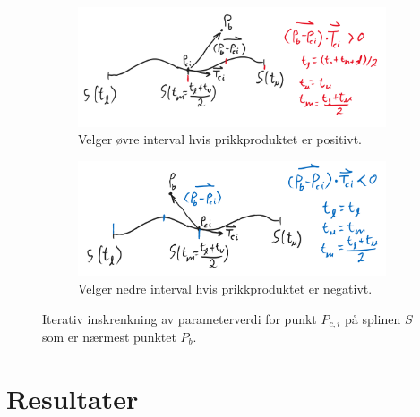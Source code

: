 \documentclass[norsk, doc, 11pt, a4paper]{apa7}  %
\begin{document}
\begin{figure}[H]
	\centering
	\begin{subfigure}{.5\textwidth}
		\centering
		\includegraphics[width=.9\linewidth]{figs/newtonPos.png}
		\caption{Velger øvre interval hvis prikkproduktet er positivt.}
	\end{subfigure}%
	\begin{subfigure}{.5\textwidth}
		\centering
		\includegraphics[width=.9\linewidth]{figs/newtonNeg.png}
		\caption{Velger nedre interval hvis prikkproduktet er negativt.}
	\end{subfigure}
	\caption{Iterativ inskrenkning av parameterverdi for punkt \(P_{c,i}\) på splinen \(S\) som er nærmest punktet \(P_{b}\).}
\end{figure}

\section{Resultater}
\end{document}
